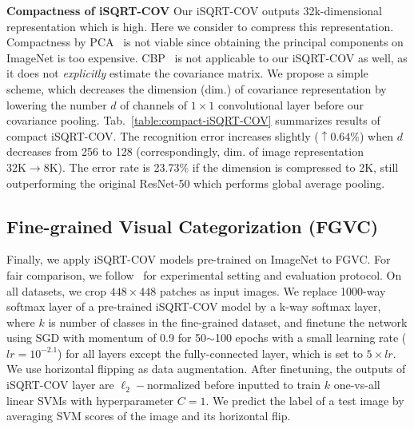 \documentclass[10pt,twocolumn,letterpaper]{article}
\begin{document}
\vspace{4pt}\noindent\textbf{Compactness of iSQRT-COV}\quad 
Our iSQRT-COV outputs  32k-dimensional  representation which is high. Here we consider to compress this representation. Compactness by PCA~\cite{lin2015bilinear} is not viable since obtaining the principal components on ImageNet is too expensive. CBP~\cite{Gao_2016_CVPR} is not applicable to our iSQRT-COV as well, as it does not \textit{explicitly} estimate the covariance matrix. We propose a simple scheme, which decreases the dimension (dim.)  of covariance representation by lowering the number $d$ of channels of $1\times 1$ convolutional layer before our covariance pooling.  
Tab.~\ref{table:compact-iSQRT-COV} summarizes  results of compact iSQRT-COV. The recognition error increases slightly  ($\uparrow 0.64\%$) when $d$ decreases from 256 to 128 (correspondingly, dim. of image representation $32\text{K}\to 8\text{K}$). The error rate is 23.73$\%$ if the dimension is compressed to 2$\text{K}$, still outperforming the original ResNet-50 which performs global average pooling. 



\subsection{Fine-grained Visual Categorization (FGVC)}

Finally, we apply  iSQRT-COV models pre-trained on ImageNet to FGVC. 
For fair comparison, we follow~\cite{lin2015bilinear} for experimental setting and evaluation protocol. On all  datasets, we crop $448\times 448$ patches as input images.  We replace  1000-way softmax layer of a pre-trained iSQRT-COV model by a k-way softmax layer, where $k$ is number of classes in the fine-grained dataset, and finetune the network using SGD with momentum of 0.9 for 50$\sim$100 epochs with a small learning rate ($lr$$=$$10^{-2.1}$) for all layers except the fully-connected layer, which is set to $5\times lr$. We use horizontal flipping as data augmentation. After finetuning, the outputs of iSQRT-COV layer are  $\ell_{2}-$normalized before inputted to train $k$ one-vs-all linear SVMs with hyperparameter $C=1$. We predict the label of a test image  by averaging SVM scores of the  image and its horizontal flip.   
\end{document}
